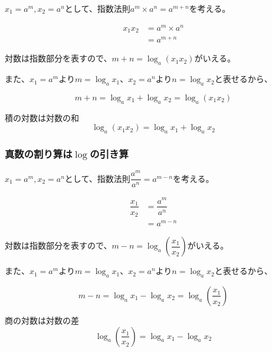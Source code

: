 \documentclass[../../imaging-math]{subfiles}
\begin{document}
$x_1 = a^m, x_2 = a^n$として、指数法則$a^m \times a^n = a^{m+n}$を考える。

\begin{align}
  x_1  x_2 & = a^m \times a^n \\
           & = a^{m+n}
\end{align}

対数は指数部分を表すので、$m+n = \log_a (x_1x_2)$がいえる。

また、$x_1 = a^m$より$m = \log_a x_1$、$x_2 = a^n$より$n = \log_a x_2$と表せるから、

\begin{equation}
  m + n = \log_a x_1 + \log_a x_2 = \log_a (x_1x_2)
\end{equation}

\begin{theorem}{積の対数は対数の和}
  \LARGE
  \begin{equation}
    \log_a (x_1x_2) = \log_a x_1 + \log_a x_2
  \end{equation}
\end{theorem}

\subsubsection{真数の割り算は$\log$の引き算}

$x_1 = a^m, x_2 = a^n$として、指数法則$\dfrac{a^m}{a^n} = a^{m-n}$を考える。

\begin{align}
  \dfrac{x_1}{x_2} & = \dfrac{a^m}{a^n} \\
                   & = a^{m-n}
\end{align}

対数は指数部分を表すので、$m-n = \log_a \left( \dfrac{x_1}{x_2} \right)$がいえる。

また、$x_1 = a^m$より$m = \log_a x_1$、$x_2 = a^n$より$n = \log_a x_2$と表せるから、

\begin{equation}
  m - n = \log_a x_1 - \log_a x_2 = \log_a \left( \dfrac{x_1}{x_2} \right)
\end{equation}

\begin{theorem}{商の対数は対数の差}
  \LARGE
  \begin{equation}
    \log_a \left( \dfrac{x_1}{x_2} \right) = \log_a x_1 - \log_a x_2
  \end{equation}
\end{theorem}
\end{document}
